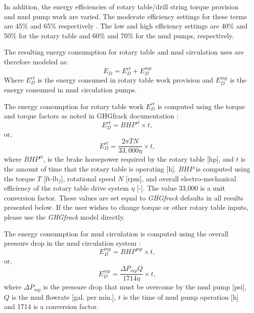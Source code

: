 \documentclass[11pt]{report}
\begin{document}
In addition, the energy efficiencies of rotary table/drill string torque provision and mud pump work are varied. The moderate efficiency settings for these terms are 45\% and 65\% respectively \cite{Vafi2016b}.  The low and high efficiency settings are 40\% and 50\% for the rotary table and 60\% and 70\% for the mud pumps, respectively.

The resulting energy consumption for rotary table and mud circulation uses are therefore modeled as:
\begin{equation}
E_{D} = E_{D}^{rt} + E_{D}^{mp}
\end{equation}
Where $E_{D}^{rt}$ is the energy consumed in rotary table work provision and $E_{D}^{mp}$ is the energy consumed in mud circulation pumps.

The energy consumption for rotary table work $E_{D}^{rt}$ is computed using the torque and torque factors as noted in GHGfrack documentation \cite{Vafi2016b}:
\begin{equation}
E_{D}^{rt} = BHP^{rt} \times t,
\end{equation}
or,
\begin{equation}
E_{D}^{rt} = \frac{2 \pi T N}{33,000 \eta} \times t,
\end{equation}
where $BHP^{rt}$, is the brake horsepower required by the rotary table [hp], and $t$ is the amount of time that the rotary table is operating [h]. $BHP$ is computed using the torque $T$ [ft-lb$_f$], rotational speed $N$ [rpm], and overall electro-mechanical efficiency of the rotary table drive system $\eta$ [-]. The value 33,000 is a unit conversion factor.  These values are set equal to \emph{GHGfrack} defaults in all results presented below. If the user wishes to change torque or other rotary table inputs, please use the \emph{GHGfrack} model directly. 

The energy consumption for mud circulation is computed using the overall pressure drop in the mud circulation system \cite{Vafi2016b}:
\begin{equation}
E_{D}^{mp} = BHP^{mp} \times t,
\end{equation}
or,
\begin{equation}
E_{D}^{mp} = \frac{\Delta P_{mp} Q}{1714 \eta} \times t,
\end{equation}
where $\Delta P_{mp}$ is the pressure drop that must be overcome by the mud pump [psi], $Q$ is the mud flowrate [gal. per min.], $t$ is the time of mud pump operation [h] and 1714 is a conversion factor.
\end{document}
